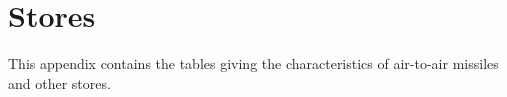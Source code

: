 \chapter{Stores}
\thispagestyle{fancy}

This appendix contains the tables giving the characteristics of air-to-air missiles and other stores.







